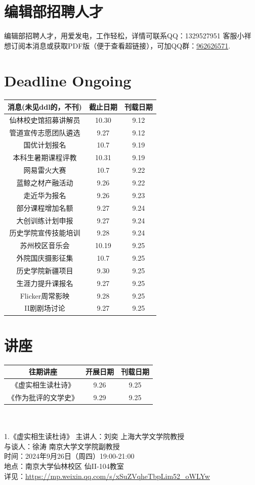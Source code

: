 \documentclass[letterpaper, 12pt]{article}
\begin{document}
\begin{multicols}{2}
\section{编辑部招聘人才}
编辑部招聘人才，用爱发电，工作轻松，详情可联系QQ：1329527951 客服小祥\\想订阅本消息或获取PDF版（便于查看超链接），可加QQ群：\href{https://qm.qq.com/q/FGX1VYCrGS}{962626571}.
\section{Deadline Ongoing}
\begin{tabular}{|c|c|c|}
    \hline
    消息(未见ddl的，不刊) & 截止日期 & 刊载日期\\
    \hline\hline
    仙林校史馆招募讲解员 & 10.30 & 9.12\\
    管道宣传志愿团队遴选 & 9.27 & 9.12\\
    国优计划报名 & 10.7 & 9.19\\
    本科生暑期课程评教 & 10.31 & 9.19\\
    网易雷火大赛 & 10.7 & 9.22\\
    蓝鲸之材产融活动 & 9.26 & 9.22\\
    走近华为报名 & 9.26 & 9.23\\
    部分课程增加名额 & 9.27 & 9.24\\
    大创训练计划申报 & 9.27 & 9.24\\
    历史学院宣传技能培训 & 9.28 & 9.24\\
    苏州校区音乐会 & 10.19 & 9.25\\
    外院国庆摄影征集 & 10.7 & 9.25\\
    历史学院新疆项目 & 9.30 & 9.25\\
    生涯力提升课报名 & 9.27 & 9.25\\
    Flicker周常影映 & 9.28 & 9.25\\
    II剧剧场讨论 & 9.27 & 9.25\\

    
    \hline
\end{tabular}

\section{讲座}

\begin{tabular}{|c|c|c|}
    \hline
    往期讲座 & 开展日期 & 刊载日期\\
    \hline\hline
    《虚实相生读杜诗》 & 9.26 & 9.25\\
    《作为批评的文学史》 & 9.29 & 9.25\\
    \hline
\end{tabular}\\\\
1.《虚实相生读杜诗》
主讲人：刘奕 上海大学文学院教授\\
与谈人：徐涛 南京大学文学院副教授\\
时间：2024年9月26日（周四）19:00-21:00\\
地点：南京大学仙林校区 仙II-104教室\\
详见：\url{https://mp.weixin.qq.com/s/xSuZVqheTbpLim52_oWLYw}\\

\end{multicols}
\end{document}
